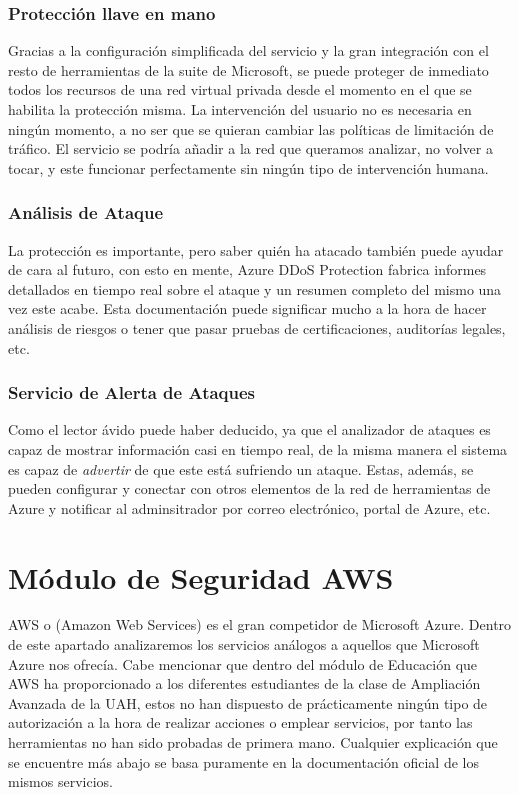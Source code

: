 \documentclass[english,runningheads,a4paper]{llncs}[2018/03/10]
\begin{document}
\subsubsection*{Protección llave en mano}
Gracias a la configuración simplificada del servicio y la gran integración con
el resto de herramientas de la suite de Microsoft, se puede proteger de
inmediato todos los recursos de una red virtual privada desde el momento en el
que se habilita la protección misma. La intervención del usuario no es necesaria
en ningún momento, a no ser que se quieran cambiar las políticas de limitación
de tráfico. El servicio se podría añadir a la red que queramos analizar, no
volver a tocar, y este funcionar perfectamente sin ningún tipo de intervención
humana.

\subsubsection*{Análisis de Ataque}
La protección es importante, pero saber quién ha atacado también puede ayudar de
cara al futuro, con esto en mente, Azure DDoS Protection fabrica informes
detallados en tiempo real sobre el ataque y un resumen completo del mismo una
vez este acabe. Esta documentación puede significar mucho a la hora de hacer
análisis de riesgos o tener que pasar pruebas de certificaciones, auditorías
legales, etc.\

\subsubsection*{Servicio de Alerta de Ataques}
Como el lector ávido puede haber deducido, ya que el analizador de ataques es
capaz de mostrar información casi en tiempo real, de la misma manera el sistema
es capaz de \textit{advertir} de que este está sufriendo un ataque. Estas,
además, se pueden configurar y conectar con otros elementos de la red de
herramientas de Azure y notificar al adminsitrador por correo electrónico,
portal de Azure, etc.\

\section*{Módulo de Seguridad AWS}

AWS o (Amazon Web Services) es el gran competidor de Microsoft Azure. Dentro de
este apartado analizaremos los servicios análogos a aquellos que Microsoft Azure
nos ofrecía. Cabe mencionar que dentro del módulo de Educación que AWS ha
proporcionado a los diferentes estudiantes de la clase de Ampliación Avanzada de
la UAH, estos no han dispuesto de prácticamente ningún tipo de autorización a la
hora de realizar acciones o emplear servicios, por tanto las herramientas no han
sido probadas de primera mano. Cualquier explicación que se encuentre más abajo
se basa puramente en la documentación oficial de los mismos servicios.
\end{document}
